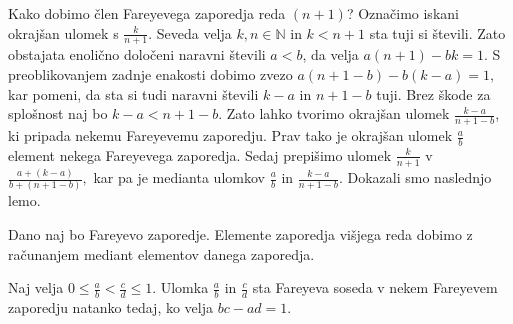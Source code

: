 \documentclass[mat1]{fmfdelo}
\begin{document}
%
Kako dobimo člen Fareyevega zaporedja reda $(n+1)$?
Označimo iskani okrajšan ulomek s $\frac{k}{n+1}$. Seveda velja $k, n \in\mathbb{N}$ in $k < n+1$ sta tuji si števili. Zato obstajata enolično določeni naravni števili $a < b$, da velja $a(n+1)-bk=1.$ S preoblikovanjem zadnje enakosti dobimo zvezo $a(n+1-b)-b(k-a)=1,$ kar pomeni, da sta si tudi naravni števili $k-a$ in $n+1-b$ tuji. Brez škode za splošnost naj bo $k-a<n+1-b.$ Zato lahko tvorimo okrajšan ulomek $\frac{k-a}{n+1-b}$, ki pripada nekemu Fareyevemu zaporedju. Prav tako je okrajšan ulomek $\frac{a}{b}$ element nekega Fareyevega zaporedja. Sedaj prepišimo ulomek $\frac{k}{n+1}$ v $\frac{a+(k-a)}{b+(n+1-b)},$ kar pa je medianta ulomkov $\frac{a}{b}$ in $\frac{k-a}{n+1-b}.$ Dokazali smo naslednjo lemo.

\begin{lema}
\label{lema:EltVišReda}
Dano naj bo Fareyevo zaporedje. Elemente zaporedja višjega reda dobimo z računanjem mediant elementov danega zaporedja.
\end{lema}

\begin{trditev}
Naj velja \( 0 \leq \frac{a}{b} < \frac{c}{d} \leq 1\). Ulomka $\frac{a}{b}$ in $\frac{c}{d}$ sta Fareyeva soseda v nekem Fareyevem zaporedju natanko tedaj, ko velja \(bc - ad = 1\).
\end{trditev}
\end{document}
